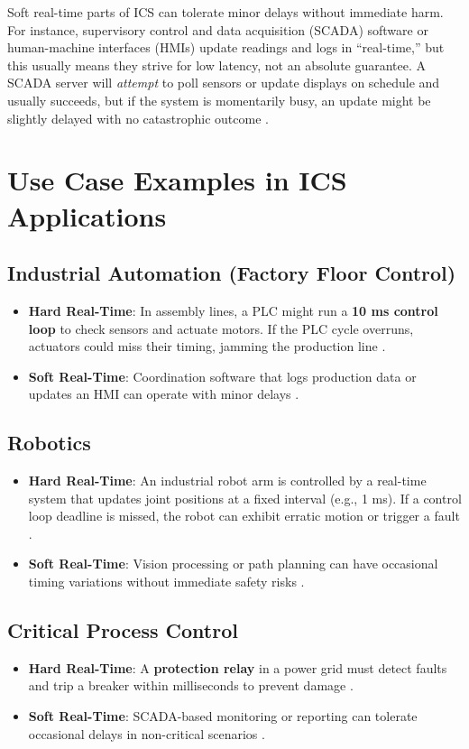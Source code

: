 \documentclass{article}
\begin{document}
Soft real-time parts of ICS can tolerate minor delays without immediate harm. For instance, supervisory control and data acquisition (SCADA) software or human-machine interfaces (HMIs) update readings and logs in “real-time,” but this usually means they strive for low latency, not an absolute guarantee. A SCADA server will \textit{attempt} to poll sensors or update displays on schedule and usually succeeds, but if the system is momentarily busy, an update might be slightly delayed with no catastrophic outcome \cite{linux_rtos}.

\section{Use Case Examples in ICS Applications}
\subsection{Industrial Automation (Factory Floor Control)}
\begin{itemize}
    \item \textbf{Hard Real-Time}: In assembly lines, a PLC might run a \textbf{10 ms control loop} to check sensors and actuate motors. If the PLC cycle overruns, actuators could miss their timing, jamming the production line \cite{plc_whitepaper}.
    \item \textbf{Soft Real-Time}: Coordination software that logs production data or updates an HMI can operate with minor delays \cite{factory_systems}.
\end{itemize}

\subsection{Robotics}
\begin{itemize}
    \item \textbf{Hard Real-Time}: An industrial robot arm is controlled by a real-time system that updates joint positions at a fixed interval (e.g., 1 ms). If a control loop deadline is missed, the robot can exhibit erratic motion or trigger a fault \cite{kuka_rsi}.
    \item \textbf{Soft Real-Time}: Vision processing or path planning can have occasional timing variations without immediate safety risks \cite{robotics_rt}.
\end{itemize}

\subsection{Critical Process Control}
\begin{itemize}
    \item \textbf{Hard Real-Time}: A \textbf{protection relay} in a power grid must detect faults and trip a breaker within milliseconds to prevent damage \cite{power_protection}.
    \item \textbf{Soft Real-Time}: SCADA-based monitoring or reporting can tolerate occasional delays in non-critical scenarios \cite{scada_realtime}.
\end{itemize}
\end{document}
